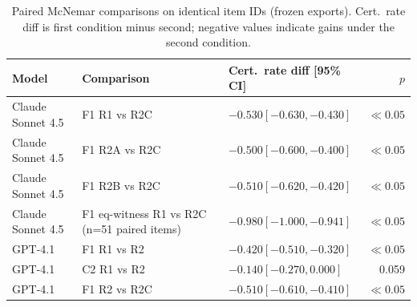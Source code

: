 \begin{table}[t]
  \centering
  \caption{Paired McNemar comparisons on identical item IDs (frozen exports).
    Cert.\ rate diff is first condition minus second; negative values indicate gains under the second condition.}
  \label{tab:results-paired-mcnemar}
  \setlength{\tabcolsep}{2pt}
  \begin{tabularx}{\columnwidth}{@{}llXr@{}}
    \toprule
    Model & Comparison & Cert.\ rate diff [95\% CI] & $p$ \\
    \midrule
    Claude Sonnet 4.5 & F1 R1 vs R2C & $-0.530 [-0.630, -0.430]$ & $\ll 0.05$ \\
    Claude Sonnet 4.5 & F1 R2A vs R2C & $-0.500 [-0.600, -0.400]$ & $\ll 0.05$ \\
    Claude Sonnet 4.5 & F1 R2B vs R2C & $-0.510 [-0.620, -0.420]$ & $\ll 0.05$ \\
    Claude Sonnet 4.5 & F1 eq-witness R1 vs R2C (n=51 paired items) & $-0.980 [-1.000, -0.941]$ & $\ll 0.05$ \\
    GPT-4.1 & F1 R1 vs R2 & $-0.420 [-0.510, -0.320]$ & $\ll 0.05$ \\
    GPT-4.1 & C2 R1 vs R2 & $-0.140 [-0.270, 0.000]$ & 0.059 \\
    GPT-4.1 & F1 R2 vs R2C & $-0.510 [-0.610, -0.410]$ & $\ll 0.05$ \\
    \bottomrule
  \end{tabularx}
\end{table}

